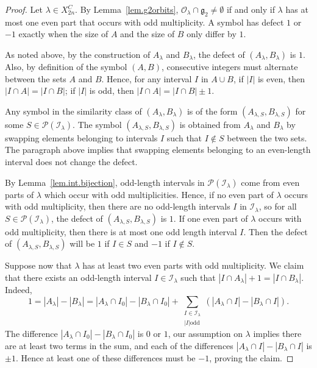 \documentclass[reqno,11pt]{amsart}
\theoremstyle{remark}
\theoremstyle{remark}
\theoremstyle{definition}
\theoremstyle{definition}
\theoremstyle{definition}
\numberwithin{equation}{section}
\newcommand{\fg}{{\mathfrak g}}
\newcommand{\gl}{\lambda}
\newcommand{\ci}{\mathcal{I}}
\newcommand{\co}{\mathcal{O}}
\begin{document}
\begin{proof} Let $\lambda\in X_{2n}^C$. By Lemma~\ref{lem.g2orbits}, $\co_{\lambda}\cap \fg_2\neq \emptyset$ if and only if $\lambda$ has at most one even part that occurs with odd multiplicity.  A symbol has defect $1$ or $-1$ exactly when the size of $A$ and the size of $B$ only differ by $1$.  

As noted above, by the construction of $A_\lambda$ and $B_\lambda$, the defect of $(A_\lambda, B_\lambda) $ is $1$.   Also, by definition of the symbol $(A,B)$, consecutive integers must alternate between the sets $A$ and $B$.  Hence, for any interval $I$ in $A\cup B$, if $|I|$ is even, then
$|I \cap A| = |I \cap B|$; if $|I|$ is odd, then $|I \cap A| = |I \cap B| \pm 1$.

Any symbol in the similarity class of $(A_\lambda, B_\lambda)$ is of the form $(A_{\lambda, S}, B_{\lambda, S})$ for some $S\in \mathscr{P}(\ci_\lambda)$.
The symbol $(A_{\lambda, S}, B_{\lambda, S})$ is obtained from $A_\lambda$ and $B_\lambda$ by swapping elements belonging to intervals $I$ such that $I\notin S$ between the two sets.  The paragraph above implies that swapping elements belonging to an even-length interval does not change the defect.  

By Lemma~\ref{lem.int.bijection}, odd-length intervals in $\mathscr{P}(\ci_\lambda)$ come from even parts of $\lambda$ which occur with odd multiplicities.  Hence, if no even part of $\lambda$ occurs with odd multiplicity, then there are no odd-length intervals $I$ in $\ci_{\lambda}$, so for all $S\in \mathscr{P}(\ci_\lambda)$, the defect of $(A_{\lambda, S}, B_{\lambda, S})$ is $1$.  If one even part of $\lambda$ occurs with odd multiplicity,  then there is at most one odd length interval $I$.   Then the defect of $(A_{\lambda,S}, B_{\lambda,S})$ will be $1$ if $I\in S$ and $-1$ if $I\notin S$. 

Suppose now that $\lambda$ has at least two even parts with odd multiplicity.  We claim that there exists an odd-length interval $I\in \ci_\lambda$ such that $|I \cap A_\lambda|+1 = |I \cap B_\lambda|$.  Indeed,
$$
1 = |A_{\gl} | - |B_{\gl} | = |A_\lambda\cap I_0| - |B_\lambda\cap I_0| + \sum_{ \substack{I \in \mathcal{I}_\lambda \\  | I | \textrm{odd}}}  ( |A_\lambda\cap I| - |B_\lambda\cap I| ).
$$
The difference $|A_\lambda\cap I_0| - |B_\lambda\cap I_0|$ is $0$ or $1$, our assumption on $\lambda$ implies there are at least two terms in the sum,  and each of the differences $|A_\lambda\cap I| - |B_\lambda\cap I|$ is $\pm 1$.  Hence
at least one of these differences must be $-1$, proving the claim.


\end{proof}
\end{document}
